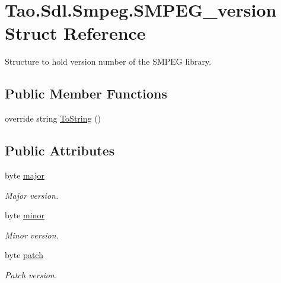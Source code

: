 \hypertarget{struct_tao_1_1_sdl_1_1_smpeg_1_1_s_m_p_e_g__version}{
\section{Tao.Sdl.Smpeg.SMPEG\_\-version Struct Reference}
\label{struct_tao_1_1_sdl_1_1_smpeg_1_1_s_m_p_e_g__version}
}


Structure to hold version number of the SMPEG library.  


\subsection*{Public Member Functions}
\begin{DoxyCompactItemize}
\item 
override string \hyperlink{struct_tao_1_1_sdl_1_1_smpeg_1_1_s_m_p_e_g__version_a5fa6b4b1237914ffcd7740e038018605}{ToString} ()
\end{DoxyCompactItemize}
\subsection*{Public Attributes}
\begin{DoxyCompactItemize}
\item 
byte \hyperlink{struct_tao_1_1_sdl_1_1_smpeg_1_1_s_m_p_e_g__version_adb74df0720a9319c1bb20f06526a5b65}{major}
\begin{DoxyCompactList}\small\item\em Major version. \item\end{DoxyCompactList}\item 
byte \hyperlink{struct_tao_1_1_sdl_1_1_smpeg_1_1_s_m_p_e_g__version_a0906e9b7421603fa666609265a5a7464}{minor}
\begin{DoxyCompactList}\small\item\em Minor version. \item\end{DoxyCompactList}\item 
byte \hyperlink{struct_tao_1_1_sdl_1_1_smpeg_1_1_s_m_p_e_g__version_aaf4fc7cf37185274d281630810301b0a}{patch}
\begin{DoxyCompactList}\small\item\em Patch version. \item\end{DoxyCompactList}\end{DoxyCompactItemize}


